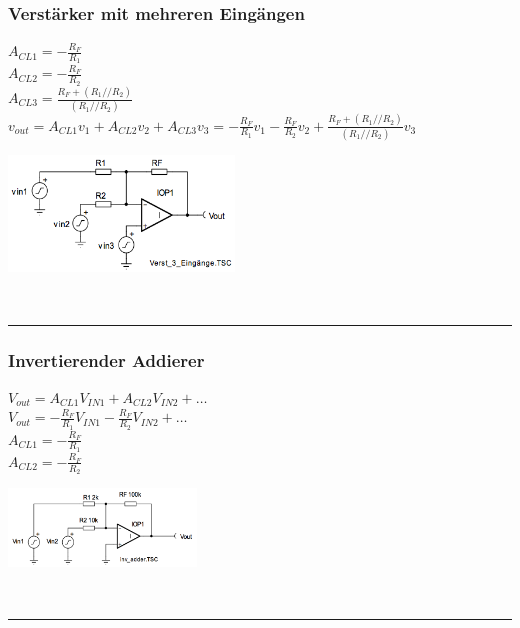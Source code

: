 		\begin{minipage}{12.5cm}
		\subsubsection{Verstärker mit mehreren Eingängen}
            	$A_{CL1}=-\frac{R_F}{R_1}$\\
            	$A_{CL2}=-\frac{R_F}{R_2}$\\
            	$A_{CL3}=\frac{R_F+(R_1//R_2)}{(R_1//R_2)}$\\
            	$v_{out}=A_{CL1}v_1+A_{CL2}v_2+A_{CL3}v_3=
            	-\frac{R_F}{R_1}v_1-\frac{R_F}{R_2}v_2+\frac{R_F+(R_1//R_2)}{(R_1//R_2)}v_3$\\
     	\end{minipage}
		\begin{minipage}{6cm}
      		\includegraphics[width=6cm]{./images/3-eingaenge.png}
      	\end{minipage}\\
\hrule

		\begin{minipage}[c]{12cm}
		\subsubsection{Invertierender Addierer}
            $V_{out}=A_{CL1}V_{IN1}+A_{CL2}V_{IN2}+\ldots$\\
            $V_{out}=- \frac{R_F}{R_1}V_{IN1}- \frac{R_F}{R_2}V_{IN2}+\ldots$\\
            $A_{CL1}=- \frac{R_F}{R_1}$\\
           	$A_{CL2}=- \frac{R_F}{R_2}$\\
      	\end{minipage}
		\begin{minipage}{5cm}
      		\includegraphics[width=5cm]{./images/invertadd.png}
      	\end{minipage}\\
\hrule

